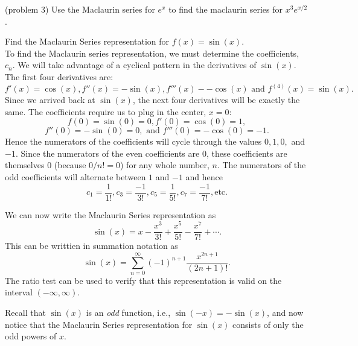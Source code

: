 \documentclass{ximera}
\begin{document}
\begin{problem}(problem 3)
Use the Maclaurin series for $e^x$ to find the maclaurin series for $x^3e^{x/2}$.
\begin{multipleChoice}
\end{multipleChoice}
\end{problem}



\begin{example} 
Find the Maclaurin Series representation for $f(x) = \sin(x)$.\\
To find the Maclaurin series representation, we must determine the coefficients, $c_n$. 
We will take advantage of a cyclical pattern in the derivatives of $\sin(x)$.
The first four derivatives are:
\[
f'(x) = \cos(x), f''(x) = -\sin(x), f'''(x) - -\cos(x) \text{ and } f^{(4)}(x) = \sin(x).
\]
Since we arrived back at $\sin(x)$, the next four derivatives will be exactly the same.
The coefficients require us to plug in the center, $x = 0$:
\[
f(0) = \sin(0) = 0, f'(0) = \cos(0) = 1,
\]
\[
 f''(0) = -\sin(0) = 0, \text{ and } f'''(0) = -\cos(0) = -1.
\]
Hence the numerators of the coefficients will cycle through the values $0, 1, 0,$ and $-1$.
Since the numerators of the even coefficients are 0, these coefficients are themselves 0 (because $0/n! = 0$) for any whole number, $n$.
The numerators of the odd coefficients will alternate between $1$ and $-1$ and hence 
\[
c_1 = \frac{1}{1!}, c_3 = \frac{-1}{3!}, c_5 = \frac{1}{5!}, c_7 = \frac{-1}{7!}, \text{etc}.
\]

We can now write the Maclaurin Series representation as
\[
\sin(x) =  x - \frac{x^3}{3!} + \frac{x^5}{5!} - \frac{x^7}{7!} + \cdots.
\]
This can be writtien in summation notation as
\[
\sin(x) = \sum_{n=0}^\infty (-1)^{n+1}\frac{x^{2n+1}}{(2n+1)!}.
\]
The ratio test can be used to verify that this representation is valid on the interval $(-\infty, \infty)$.
\begin{remark}
Recall that $\sin(x)$ is an \textit{odd} function, 
i.e., $\sin(-x) = -\sin(x)$, and now notice that the Maclaurin Series representation for $\sin(x)$ consists of only the 
odd powers of $x$. 
\end{remark}
\end{example}
\end{document}

